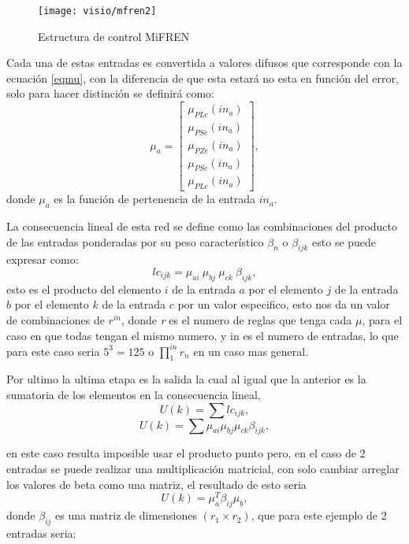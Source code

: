     \begin{figure}[h]
    	\centering
    	\texttt{[image: visio/mfren2]}
    	\caption{Estructura de control MiFREN}
    	\label{fig:mfren2}
    \end{figure}
    
    Cada una de estas entradas es convertida a valores difusos que corresponde con la ecuación \ref{eqmu}, con la diferencia de que esta estará no esta en función del error, solo para hacer distinción se definirá como:
    \begin{equation}
    \label{eqmmu}
    \mu_a=\begin{bmatrix}
    	\mu_{PLe}(in_a) \\ 
    	\mu_{PSe}(in_a)\\ 
    	\mu_{PZe}(in_a)\\ 
    	\mu_{PSe}(in_a)\\ 
    	\mu_{PLe}(in_a)
    \end{bmatrix}  ,
\end{equation}
    donde $\mu_a$ es la función de pertenencia de la entrada $in_a$.
    
    La consecuencia lineal de esta red se define como las combinaciones del producto de las entradas ponderadas por su peso característico $\beta_n$ o $\beta_{ijk}$
    esto se puede expresar como: \begin{equation}
    lc_{ijk}=\mu_{ai}\ \mu_{bj} \ \mu_{ck} \ \beta_{ijk},
    \end{equation}
    esto es el producto del elemento $i$ de la entrada $a$ por el elemento $j$ de la entrada $b$ por el elemento $k$ de la entrada $c$ por un valor especifico, esto nos da un valor de combinaciones de $r^{in}$, donde \textit{r} es el numero de reglas que tenga cada $\mu$, para el caso en que todas tengan el mismo numero, y in es el numero de entradas, lo que para este caso seria $5^3 = 125$ o $\prod_{1}^{in} r_n$
    en un caso mas general.
    
    Por ultimo la ultima etapa es la salida la cual al igual que la anterior es la sumatoria de los elementos en la consecuencia lineal, \begin{equation}    U(k)= \sum lc_{ijk} ,
    \end{equation}
    \begin{equation}
    U(k)= \sum  \mu_{ai} \mu_{bj} \mu_{ck} \beta_{ijk}  ,
    \end{equation}
    
     en este caso resulta imposible usar el producto punto pero, en el caso de 2 entradas se puede realizar una multiplicación matricial, con solo cambiar arreglar los valores de beta como una matriz, el resultado de esto seria \begin{equation}
     \label{multu}
     U(k)= \mu_{a}^{T} \beta_{ij} \mu_{b} ,
     \end{equation}  donde $\beta_{ij}$ es una matriz de dimensiones $(r_1 \times r_2)$, que para este ejemplo de 2 entradas seria:
     
